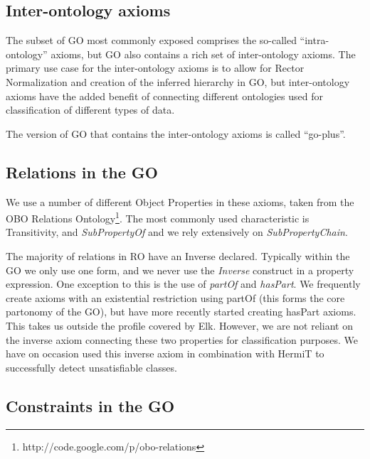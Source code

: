 \documentclass{llncs}
\begin{document}
\subsection{Inter-ontology axioms}

The subset of GO most commonly exposed comprises the so-called
``intra-ontology'' axioms, but GO also contains a rich set of
inter-ontology axioms. The primary use case for the inter-ontology
axioms is to allow for Rector Normalization and creation of the
inferred hierarchy in GO, but inter-ontology axioms have the added
benefit of connecting different ontologies used for classification of
different types of data.

The version of GO that contains the inter-ontology axioms is called
``go-plus''.

\subsection{Relations in the GO}

We use a number of different Object Properties in these axioms, taken
from the OBO Relations
Ontology\footnote{http://code.google.com/p/obo-relations}. The most
commonly used characteristic is Transitivity, and \emph{SubPropertyOf}
and we rely extensively on \emph{SubPropertyChain}.

The majority of relations in RO have an Inverse declared. Typically
within the GO we only use one form, and we never use the
\emph{Inverse} construct in a property expression. One exception to
this is the use of \emph{partOf} and \emph{hasPart}. We frequently
create axioms with an existential restriction using partOf (this forms
the core partonomy of the GO), but have more recently started creating
hasPart axioms\cite{berardini2010gene}. This takes us outside the
profile covered by Elk. However, we are not reliant on the inverse
axiom connecting these two properties for classification purposes. We
have on occasion used this inverse axiom in combination with HermiT to
successfully detect unsatisfiable classes.

\subsection{Constraints in the GO}
\end{document}
